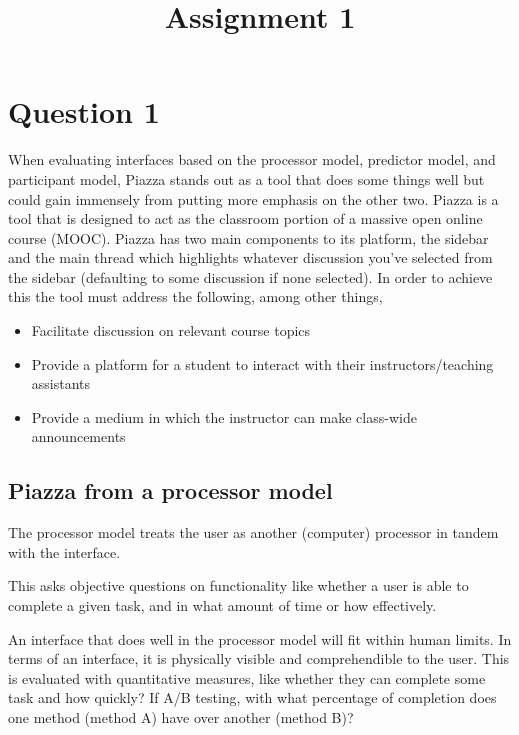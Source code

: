 

\title{Assignment 1\\}



\maketitle

\section{Question 1}
When evaluating interfaces based on the processor model, predictor model, and participant model, Piazza stands out as a tool that does some things well but could gain immensely from putting more emphasis on the other two. Piazza is a tool that is designed to act as the classroom portion of a massive open online course (MOOC). Piazza has two main components to its platform, the sidebar and the main thread which highlights whatever discussion you've selected from the sidebar (defaulting to some discussion if none selected). In order to achieve this the tool must address the following, among other things,

\begin{itemize}
\item
  Facilitate discussion on relevant course topics
\item
  Provide a platform for a student to interact with their instructors/teaching assistants
\item
  Provide a medium in which the instructor can make class-wide announcements
\end{itemize}

\subsection{Piazza from a processor model}

The processor model treats the user as another (computer) processor in tandem with the interface.

This asks objective questions on functionality like whether a user is able to complete a given task, and in what amount of time or how effectively.

An interface that does well in the processor model will fit within human limits. In terms of an interface, it is physically visible and comprehendible to the user. This is evaluated with quantitative measures, like whether they can complete some task and how quickly? If A/B testing, with what percentage of completion does one method (method A) have over another (method B)?

